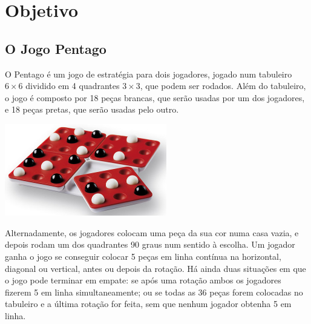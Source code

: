 
\newpage

\tableofcontents



\newpage

\section{Objetivo}
 
\subsection{O Jogo Pentago}

O Pentago é um jogo de estratégia para dois jogadores, jogado num tabuleiro $6 \times 6$ dividido em 4 quadrantes $3 \times 3$, que podem ser rodados. Além do tabuleiro, o jogo é composto por 18 peças brancas, que serão usadas por um dos jogadores, e 18 peças pretas, que serão usadas pelo outro.

\begin{table}[H]
\centering
\includegraphics[height=4cm]{images/pentago-board.jpg}
\end{table}

Alternadamente, os jogadores colocam uma peça da sua cor numa casa vazia, e depois rodam um dos quadrantes 90 graus num sentido à escolha. Um jogador ganha o jogo se conseguir colocar 5 peças em linha contínua na horizontal, diagonal ou vertical, antes ou depois da rotação. Há ainda duas situações em que o jogo pode terminar em empate: se após uma rotação ambos os jogadores fizerem 5 em linha simultaneamente; ou se todas as 36 peças forem colocadas no tabuleiro e a última rotação for feita, sem que nenhum jogador obtenha 5 em linha.

